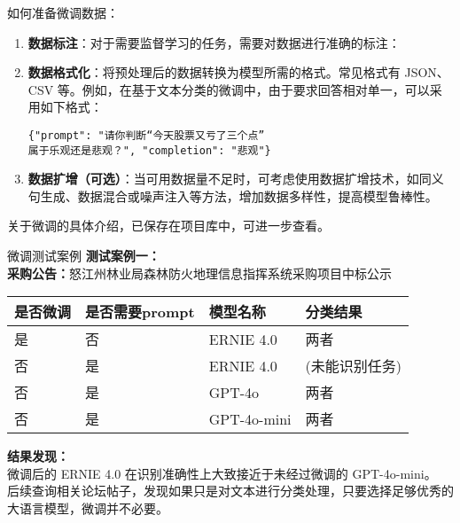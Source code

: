 \documentclass{beamer}
\begin{document}
\begin{frame}[fragile]{如何准备微调数据：}

\begin{enumerate}
    \item \textbf{数据标注}：对于需要监督学习的任务，需要对数据进行准确的标注：
    \item \textbf{数据格式化}：将预处理后的数据转换为模型所需的格式。常见格式有 JSON、CSV 等。例如，在基于文本分类的微调中，由于要求回答相对单一，可以采用如下格式：
    \begin{verbatim}
{"prompt": "请你判断“今天股票又亏了三个点”
属于乐观还是悲观？", "completion": "悲观"}
    \end{verbatim}
    \item \textbf{数据扩增（可选）}：当可用数据量不足时，可考虑使用数据扩增技术，如同义句生成、数据混合或噪声注入等方法，增加数据多样性，提高模型鲁棒性。
\end{enumerate}

关于微调的具体介绍，已保存在项目库中，可进一步查看。
\end{frame}

\begin{frame}[fragile]{微调测试案例}
    \small
    \textbf{测试案例一：}\\[0.5em]
    \textbf{采购公告：}怒江州林业局森林防火地理信息指挥系统采购项目中标公示\\[1em]
    \begin{tabular}{llll}
    \toprule
    是否微调 & 是否需要prompt & 模型名称 & 分类结果 \\
    \midrule
    是 & 否 & ERNIE 4.0   & 两者 \\
    否 & 是 & ERNIE 4.0      & (未能识别任务) \\
    否 & 是 & GPT-4o            & 两者 \\
    否 & 是 & GPT-4o-mini       & 两者 \\
    \bottomrule
    \end{tabular}
  
    \textbf{结果发现：}\\[0.5em]
    微调后的 ERNIE 4.0 在识别准确性上大致接近于未经过微调的 GPT-4o-mini。\\
    后续查询相关论坛帖子，发现如果只是对文本进行分类处理，只要选择足够优秀的大语言模型，微调并不必要。
    \end{frame}
    


\end{document}
